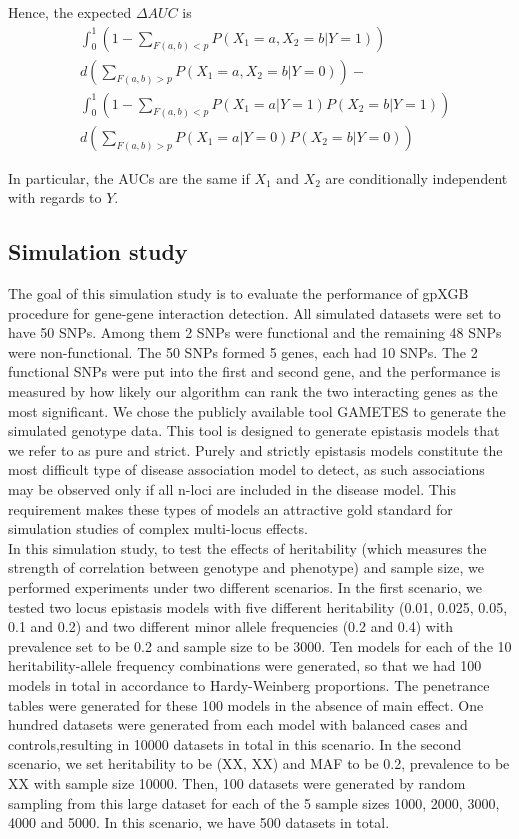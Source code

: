 \documentclass[11pt]{article}
\theoremstyle{plain}
\theoremstyle{definition}
\theoremstyle{remark}
\begin{document}
Hence, the expected $\Delta AUC$ is
\begin{align*}
&\int_0^1\left(1-\sum_{F(a,b)<p}P(X_1=a,X_2=b|Y=1)\right)\\
& d\left(\sum_{F(a,b)>p}P(X_1=a,X_2=b|Y=0)\right)-\\
&\int_0^1 \left(1-\sum_{F(a,b)<p}P(X_1=a|Y=1)P(X_2=b|Y=1)\right)\\
& d\left(\sum_{F(a,b)>p}P(X_1=a|Y=0)P(X_2=b|Y=0)\right)
\end{align*}

In particular, the AUCs are the same if $X_1$ and $X_2$ are conditionally independent with regards to $Y$.


\subsection{Simulation study}

The goal of this simulation study is to evaluate the performance of gpXGB procedure for gene-gene interaction detection. All simulated datasets were set to have 50 SNPs. Among them 2 SNPs were functional and the remaining 48 SNPs were non-functional. The 50 SNPs formed 5 genes, each had 10 SNPs. The 2 functional SNPs were put into the first and second gene, and the performance is measured by how likely our algorithm can rank the two interacting genes as the most significant. We chose the publicly available tool GAMETES \cite{11} to generate the simulated genotype data. This tool is designed to generate epistasis models that we refer to as pure and strict. Purely and strictly epistasis models constitute the most difficult type of disease association model to detect, as such associations may be observed only if all n-loci are included in the disease model. This requirement makes these types of models an attractive gold standard for simulation studies of complex multi-locus effects. \\

In this simulation study, to test the effects of heritability (which measures the strength of correlation between genotype and phenotype) and sample size, we performed experiments under two different scenarios. In the first scenario, we tested two locus epistasis models with five different heritability (0.01, 0.025, 0.05, 0.1 and 0.2) and two different minor allele frequencies (0.2 and 0.4) with prevalence set to be 0.2 and sample size to be 3000. Ten models for each of the 10 heritability-allele frequency combinations were generated, so that we had 100 models in total in accordance to Hardy-Weinberg proportions. The penetrance tables were generated for these 100 models in the absence of main effect. One hundred datasets were generated from each model with balanced cases and controls,resulting in 10000 datasets in total in this scenario. In the second scenario, we set heritability to be (XX, XX) and MAF to be 0.2, prevalence to be XX with sample size 10000. Then, 100 datasets were generated by random sampling from this large dataset for each of the 5 sample sizes 1000, 2000, 3000, 4000 and 5000. In this scenario, we have 500 datasets in total.\\
\end{document}
